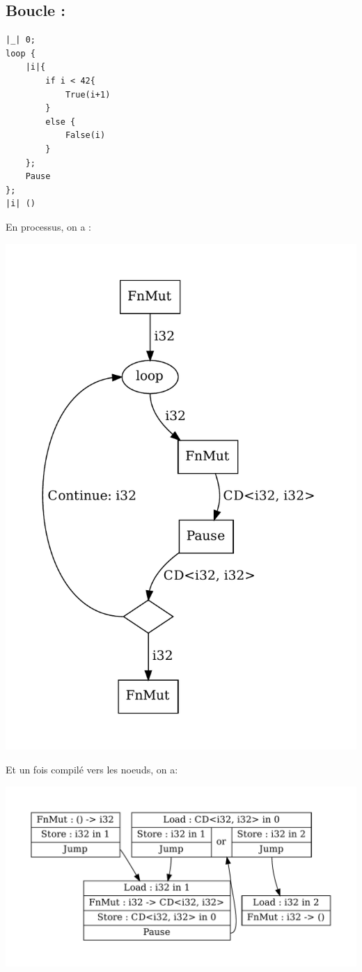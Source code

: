 \documentclass[a4paper]{article}
\renewcommand{\(}{\left(}
\renewcommand{\)}{\right)}
\begin{document}
\subsection{Boucle :}

\begin{verbatim}
|_| 0;
loop {
    |i|{
        if i < 42{
            True(i+1)
        }
        else {
            False(i)
        }
    };
    Pause
};
|i| ()
\end{verbatim}

En processus, on a :
\begin{center}
\includegraphics[scale=0.72]{loopp.pdf}
\end{center}

Et un fois compilé vers les noeuds, on a:
\begin{center}
\includegraphics[scale=0.72]{loopn.pdf}
\end{center}
\end{document}
